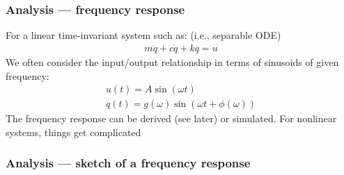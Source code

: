 \documentclass[10pt]{beamer-control}
\begin{document}
\begin{frame}
  \frametitle{Analysis --- frequency response}
  For a linear time-invariant system such as: (i.e., separable ODE)
  \begin{gather}
    m\ddot q + c\dot q + k q = u
  \end{gather}
  We often consider the input/output relationship in terms of sinusoids of given frequency:
  \begin{gather}
    u(t) = A\sin(\omega t) \\
    q(t) = g(\omega)\sin(\omega t + \phi(\omega))
  \end{gather}
  The frequency response can be derived (see later) or simulated. For nonlinear systems, things get complicated
\end{frame}

\begin{frame}
  \frametitle{Analysis --- sketch of a frequency response}
\end{frame}


\SUMMARYFRAME
\FINALE
\end{document}
